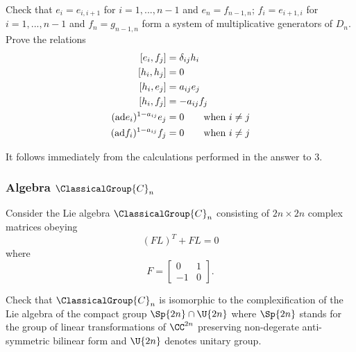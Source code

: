 \begin{exercise}
Check that $e_{i}=e_{i,i+1}$ for $i=1,...,n-1$ and
$e_{n}=f_{n-1,n}$; $f_{i}=e_{i+1,i}$ for $i=1,...,n-1$ and
$f_{n}=g_{n-1,n}$ form a system of multiplicative generators of
$D_{n}$. Prove the relations
\begin{subequations}
\begin{align}
[e_{i},f_{j}]&=\delta_{ij}h_{i}\\
[h_{i},h_{j}]&=0\\
[h_{i},e_{j}]&=a_{ij}e_{j}\\
[h_{i},f_{j}]&=-a_{ij}f_{j}\\
({\rm ad}e_{i})^{1-a_{ij}}e_{j}&=0\qquad\hbox{when $i\not=j$}\\
({\rm ad}f_{i})^{1-a_{ij}}f_{j}&=0\qquad\hbox{when $i\not=j$}
\end{align}
\end{subequations}
\end{exercise}

\answer It follows immediately from the calculations performed in
the answer to 3.

\subsubsection{Algebra \texorpdfstring{$\ClassicalGroup{C}_{n}$}{Cn}}

Consider the Lie algebra $\ClassicalGroup{C}_{n}$ consisting of $2n\times2n$
complex matrices obeying
\begin{equation}
(FL)^{T}+FL=0
\end{equation}
where
\begin{equation}
F=\begin{bmatrix}0&1\\
-1&0
\end{bmatrix}.
\end{equation}

\begin{exercise}
Check that $\ClassicalGroup{C}_{n}$ is isomorphic to the complexification of the
Lie algebra of the compact group $\Sp{2n}\cap \U{2n}$ where
$\Sp{2n}$ stands for the group of linear transformations of
$\CC^{2n}$ preserving non-degerate anti-symmetric bilinear
form and $\U{2n}$ denotes unitary group.
\end{exercise}

